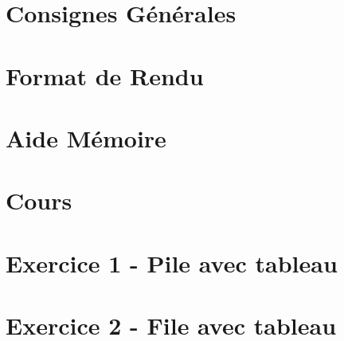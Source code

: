 \documentclass[12pt,a4paper]{article}
\begin{document}
\maketitle





\newpage

\tableofcontents

\newpage

\section{Consignes Générales}

\bigskip



\newpage

\section{Format de Rendu}
\label{sec:FormatDeRendu}

\vspace*{1cm}



\newpage

\section{Aide Mémoire}
\label{sec:AideMemoire}

\vspace*{1cm}



\newpage


\section{Cours}

\vspace*{0.7cm}



\newpage


\section{Exercice 1 - Pile avec tableau}

\vspace*{0.7cm}



\newpage

\section{Exercice 2 - File avec tableau}

\vspace*{0.7cm}


\end{document}
